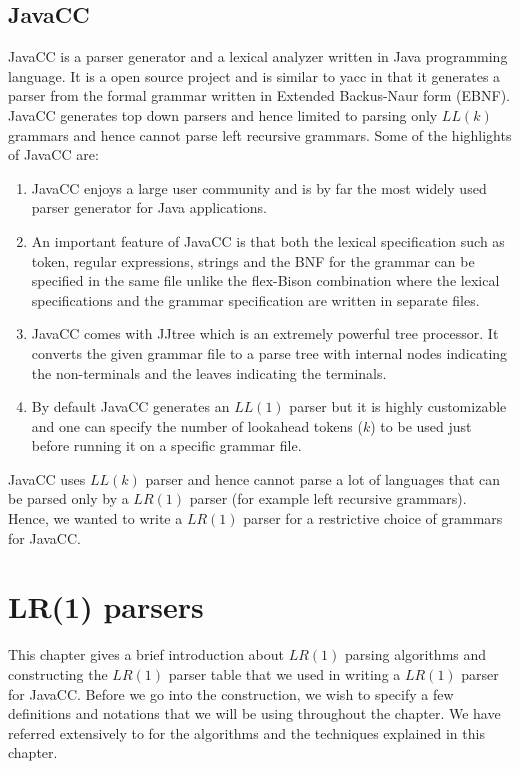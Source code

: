 \documentclass[•]{book}
\begin{document}
\section{JavaCC}
JavaCC is a parser generator and a lexical analyzer written in Java programming language. It is a open source project and is similar to yacc in that it generates a parser from the formal grammar written in Extended Backus-Naur form (EBNF). JavaCC generates top down parsers and hence limited to parsing only $LL(k)$ grammars and hence cannot parse left recursive grammars. Some of the highlights of JavaCC are:

\begin{enumerate}
\item JavaCC enjoys a large user community and is by far the most widely used parser generator for Java applications.
\item An important feature of JavaCC is that both the lexical specification such as token, regular expressions, strings and the BNF for the grammar can be specified in the same file unlike the flex-Bison combination where the lexical specifications and the grammar specification are written in separate files.
\item JavaCC comes with JJtree which is an extremely powerful tree processor. It converts the given grammar file to a parse tree with internal nodes indicating the non-terminals and the leaves indicating the terminals.
\item By default JavaCC generates an $LL(1)$ parser but it is highly customizable and one can specify the number of lookahead tokens ($k$) to be used just before running it on a specific grammar file.  
\end{enumerate}
 
 JavaCC uses $LL(k)$ parser and hence cannot parse a lot of languages that can be parsed only by a $LR(1)$ parser (for example left recursive grammars). Hence, we wanted to write a $LR(1)$ parser for a restrictive choice of grammars for JavaCC.
 
 \chapter{LR(1) parsers}

This chapter gives a brief introduction about $LR(1)$ parsing algorithms and constructing the $LR(1)$ parser table that we used in writing a $LR(1)$ parser for JavaCC. Before we go into the construction, we wish to specify a few definitions and notations that we will be using throughout the chapter. We have referred extensively to \cite{aho1985} for the algorithms and the techniques explained in this chapter.
\end{document}
